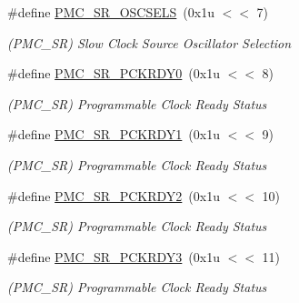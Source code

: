 \begin{DoxyCompactItemize}
\#define \mbox{\hyperlink{group__SAMS70__PMC_ga3457d80fc8da68f5e954ab338f49fa22}{P\+M\+C\+\_\+\+S\+R\+\_\+\+O\+S\+C\+S\+E\+LS}}~(0x1u $<$$<$ 7)
\begin{DoxyCompactList}\small\item\em (P\+M\+C\+\_\+\+SR) Slow Clock Source Oscillator Selection \end{DoxyCompactList}\item 
\mbox{\label{group__SAMS70__PMC_ga93e796516593a50d41d0aed02d2f0a27}} 
\#define \mbox{\hyperlink{group__SAMS70__PMC_ga93e796516593a50d41d0aed02d2f0a27}{P\+M\+C\+\_\+\+S\+R\+\_\+\+P\+C\+K\+R\+D\+Y0}}~(0x1u $<$$<$ 8)
\begin{DoxyCompactList}\small\item\em (P\+M\+C\+\_\+\+SR) Programmable Clock Ready Status \end{DoxyCompactList}\item 
\mbox{\label{group__SAMS70__PMC_ga02a40065bfafdb6c76cb8618e00091c1}} 
\#define \mbox{\hyperlink{group__SAMS70__PMC_ga02a40065bfafdb6c76cb8618e00091c1}{P\+M\+C\+\_\+\+S\+R\+\_\+\+P\+C\+K\+R\+D\+Y1}}~(0x1u $<$$<$ 9)
\begin{DoxyCompactList}\small\item\em (P\+M\+C\+\_\+\+SR) Programmable Clock Ready Status \end{DoxyCompactList}\item 
\mbox{\label{group__SAMS70__PMC_ga838da836c3f0f5774e9ecae5138efe5c}} 
\#define \mbox{\hyperlink{group__SAMS70__PMC_ga838da836c3f0f5774e9ecae5138efe5c}{P\+M\+C\+\_\+\+S\+R\+\_\+\+P\+C\+K\+R\+D\+Y2}}~(0x1u $<$$<$ 10)
\begin{DoxyCompactList}\small\item\em (P\+M\+C\+\_\+\+SR) Programmable Clock Ready Status \end{DoxyCompactList}\item 
\mbox{\label{group__SAMS70__PMC_ga7d8e14b8ea36ca7d98d9fd0ff18a6c83}} 
\#define \mbox{\hyperlink{group__SAMS70__PMC_ga7d8e14b8ea36ca7d98d9fd0ff18a6c83}{P\+M\+C\+\_\+\+S\+R\+\_\+\+P\+C\+K\+R\+D\+Y3}}~(0x1u $<$$<$ 11)
\begin{DoxyCompactList}\small\item\em (P\+M\+C\+\_\+\+SR) Programmable Clock Ready Status \end{DoxyCompactList}\item 
$$
\end{DoxyCompactItemize}
